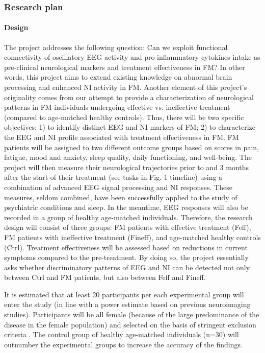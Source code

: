 \documentclass[twocolumn,  rga,issue, numeric]{jote-new-article}
\begin{document}
\subsubsection{Research plan}


\noindent\paragraph{\noindent Design}


The project addresses the following question: Can we exploit functional
connectivity of oscillatory EEG activity and pro-inflammatory cytokines
intake as pre-clinical neurological markers and treatment effectiveness
in FM? In other words, this project aims to extend existing knowledge on
abnormal brain processing and enhanced NI activity in FM. Another
element of this project's originality comes from our attempt to provide
a characterization of neurological patterns in FM individuals undergoing
effective vs. ineffective treatment (compared to age-matched healthy
controls). Thus, there will be two specific objectives: 1) to identify
distinct EEG and NI markers of FM; 2) to characterize the EEG and NI
profile associated with treatment effectiveness in FM. FM patients will
be assigned to two different outcome groups based on scores in pain,
fatigue, mood and anxiety, sleep quality, daily functioning, and
well-being. The project will then measure their neurological
trajectories prior to and 3 months after the start of their treatment
(see tasks in Fig. 1 timeline) using a combination of advanced EEG
signal processing and NI responses. These measures, seldom combined,
have been successfully applied to the study of psychiatric conditions
and sleep. In the meantime, EEG responses will also be recorded in a
group of healthy age-matched individuals. Therefore, the research design
will consist of three groups: FM patients with effective treatment
(Feff), FM patients with ineffective treatment (Fineff), and age-matched
healthy controls (Ctrl). Treatment effectiveness will be assessed based
on reductions in current symptoms compared to the pre-treatment. By
doing so, the project essentially asks whether discriminatory patterns
of EEG and NI can be detected not only between Ctrl and FM patients, but
also between Feff and Fineff.

It is estimated that at least 20 participants per each experimental
group will enter the study (in line with a power estimate based on
previous neuroimaging studies). Participants will be all female (because
of the large predominance of the disease in the female population) and
selected on the basis of stringent exclusion
criteria \cite{Napadow2010}. The control group of healthy age-matched
individuals (n=30) will outnumber the experimental groups to increase
the accuracy of the findings.
\end{document}

